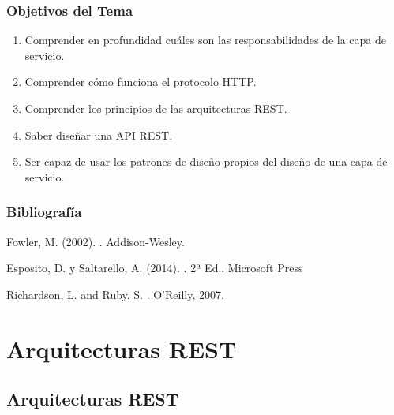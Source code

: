 \documentclass[a4paper,slidestop,xcolor=pst,blue]{beamer}
\begin{document}
\begin{frame}[c]
    \frametitle{Objetivos del Tema}
    \begin{enumerate}[<+->]
         \item Comprender en profundidad cuáles son las responsabilidades de la capa de servicio.
         \item Comprender cómo funciona el protocolo HTTP.
         \item Comprender los principios de las arquitecturas REST.
         \item Saber diseñar una API REST.
         \item Ser capaz de usar los patrones de diseño propios del diseño de una capa de servicio.
    \end{enumerate}
\end{frame}

\begin{frame}[c]
    \frametitle{Bibliografía}
    \begin{thebibliography}{1}

        Fowler, M. (2002).
        .
        \newblock Addison-Wesley.

        Esposito, D. y Saltarello, A. (2014).
        . 2ª Ed..
        \newblock Microsoft Press

        Richardson, L. and Ruby, S.
        .
        \newblock  O'Reilly, 2007.

    \end{thebibliography}
\end{frame}

\section{Arquitecturas REST}

\subsection{Arquitecturas REST}
\end{document}
